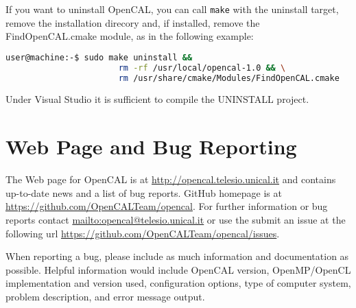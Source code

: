 If you want to uninstall OpenCAL, you can call \verb'make' with the
uninstall target, remove the installation direcory and, if installed,
remove the FindOpenCAL.cmake module, as in the following example:

\begin{lstlisting}[numbers=none,language=bash,label={ch:quickstart:sudouninstall}]
  user@machine:-$ sudo make uninstall && 
                       rm -rf /usr/local/opencal-1.0 && \
                       rm /usr/share/cmake/Modules/FindOpenCAL.cmake
\end{lstlisting}

Under Visual Studio it is sufficient to compile the UNINSTALL project.

\section{Web Page and Bug Reporting}

The Web page for OpenCAL is at \url{http://opencal.telesio.unical.it} and
contains up-to-date news and a list of bug reports. \ocal GitHub
homepage is at \url{https://github.com/OpenCALTeam/opencal}. For
further information or bug reports contact
\url{mailto:opencal@telesio.unical.it} or use the submit an issue at the
following url \url{https://github.com/OpenCALTeam/opencal/issues}.

When reporting a bug, please include as much information and
documentation as possible. Helpful information would include OpenCAL
version, OpenMP/OpenCL implementation and version used,
configuration options, type of computer system, problem description,
and error message output.

